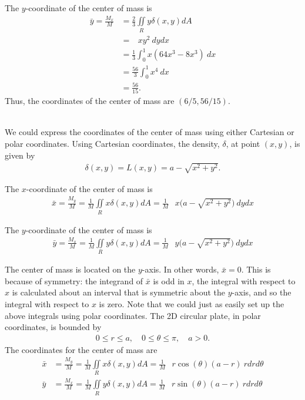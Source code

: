 The $y$-coordinate of the center of mass is
\begin{align*}
  \bar{y} = \frac{M_x}{M} 
  &= \frac{2}{3} \iint\limits_R y \delta(x,y) dA \\
  &=    \mathop{\int_0^1 \!\! \int_{2x}^{4x} } xy^2 \ dydx \\
  &=  \frac{1}{3}  \int_0^1 x(64x^3 - 8x^3) \ dx \\
  &=  \frac{56}{3}  \int_0^1 x^4 \ dx \\
  &=   \frac{56}{15}.
\end{align*}
Thus, the coordinates of the center of mass are $(6/5,56/15)$.
\item %
 \\
We could express the coordinates of the center of mass using either Cartesian or polar coordinates. Using Cartesian coordinates, the density, $\delta$, at point $(x,y)$, is given by
\begin{align*}
  \delta(x,y) = L(x,y) = a - \sqrt{x^2+y^2}.
\end{align*}
\BEN
\item
The $x$-coordinate of the center of mass is
\begin{align*}
  \bar{x} = \frac{M_y}{M} 
  = \frac{1}{M} \iint\limits_R x \delta(x,y) dA 
  = \frac{1}{M}  \mathop{\int_{-a}^{a} \!\! \int_{0}^{\sqrt{x^2+y^2}}} x\Big( a - \sqrt{x^2+y^2}\Big) \ dydx 
\end{align*}
\item
The $y$-coordinate of the center of mass is
\begin{align*}
  \bar{y} = \frac{M_x}{M} 
  = \frac{1}{M} \iint\limits_R y \delta(x,y) dA 
  = \frac{1}{M}  \mathop{\int_{-a}^{a} \!\! \int_{0}^{\sqrt{x^2+y^2}}} y\Big( a - \sqrt{x^2+y^2}\Big) \ dydx 
\end{align*}
\item The center of mass is located on the $y$-axis. In other words, $\bar{x}=0$. This is because of symmetry: the integrand of $\bar{x}$ is odd in $x$, the integral with respect to $x$ is calculated about an interval that is symmetric about the $y$-axis, and so the integral with respect to $x$ is zero. 
\EEN
Note that we could just as easily set up the above integrals using polar coordinates. The 2D circular plate, in polar coordinates, is bounded by 
\begin{align*}
  0 \le r \le a, \quad 0 \le \theta \le \pi, \quad a > 0.
\end{align*}
The coordinates for the center of mass are
\begin{align*}
  \bar{x} &= \frac{M_y}{M} 
  = \frac{1}{M} \iint\limits_R x \delta(x,y) dA 
  = \frac{1}{M}  \mathop{\int_{0}^{\pi} \!\! \int_{0}^r} r\cos(\theta) ( a - r ) \ rdrd\theta \\
  \bar{y} &= \frac{M_x}{M} 
  = \frac{1}{M} \iint\limits_R y \delta(x,y) dA 
  = \frac{1}{M}  \mathop{\int_{0}^{\pi} \!\! \int_{0}^r} r\sin(\theta) ( a -r ) \ rdrd\theta
\end{align*}

